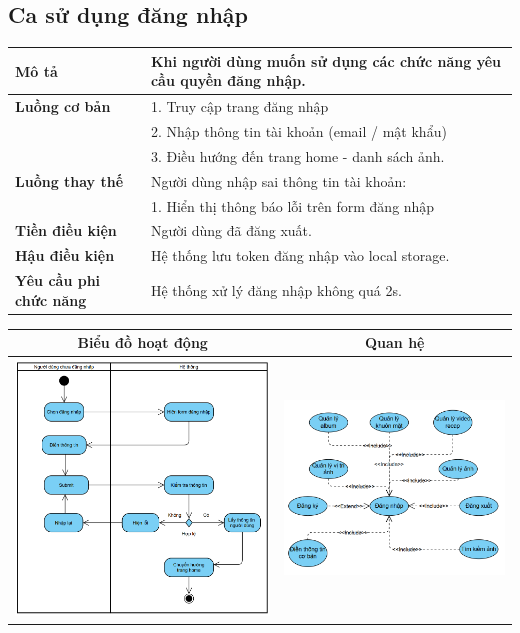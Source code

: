 \subsection{Ca sử dụng đăng nhập}
\vspace{0.5cm}

\noindent 
\begin{tabularx}{\linewidth}{| l | X |} 
\hline 
\textbf{Mô tả} & Khi người dùng muốn sử dụng các chức năng yêu cầu quyền đăng nhập. \\ 
\hline 
\textbf{Luồng cơ bản} & 1. Truy cập trang đăng nhập \\ 
                      & 2. Nhập thông tin tài khoản (email / mật khẩu) \\ 
                      & 3. Điều hướng đến trang home - danh sách ảnh. \\ 
\hline 
\textbf{Luồng thay thế} & Người dùng nhập sai thông tin tài khoản: \\ 
                       & 1. Hiển thị thông báo lỗi trên form đăng nhập \\ 
\hline 
\textbf{Tiền điều kiện} & Người dùng đã đăng xuất. \\ 
\hline 
\textbf{Hậu điều kiện} & Hệ thống lưu token đăng nhập vào local storage. \\ 
\hline 
\textbf{Yêu cầu phi chức năng} & Hệ thống xử lý đăng nhập không quá 2s. \\ 
\hline 
\end{tabularx}

\vspace{0.8cm}

\noindent 
\begin{tabular}{| c | c |}
    \hline
    \textbf{Biểu đồ hoạt động} & \textbf{Quan hệ} \\ 
    \hline
    \includegraphics[width=0.5\linewidth]{figures/c3/3-3-1-activity-diagram.png} 
    & 
    \includegraphics[width=0.45\linewidth]{figures/c3/3-3-1-relationship.png} \\ 
    \hline
\end{tabular}

